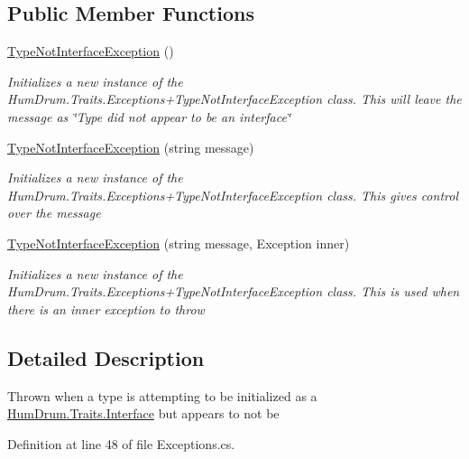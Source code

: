 \subsection*{Public Member Functions}
\begin{DoxyCompactItemize}
\item 
\hyperlink{classHumDrum_1_1Traits_1_1Exceptions_1_1TypeNotInterfaceException_a29b2ddfce71c620a9c62087149af2f23}{Type\+Not\+Interface\+Exception} ()
\begin{DoxyCompactList}\small\item\em Initializes a new instance of the Hum\+Drum.\+Traits.\+Exceptions+\+Type\+Not\+Interface\+Exception class. This will leave the message as \char`\"{}\+Type did not appear to be an interface\char`\"{} \end{DoxyCompactList}\item 
\hyperlink{classHumDrum_1_1Traits_1_1Exceptions_1_1TypeNotInterfaceException_afb1f9e4016996d15d225cb0b3fe826c3}{Type\+Not\+Interface\+Exception} (string message)
\begin{DoxyCompactList}\small\item\em Initializes a new instance of the Hum\+Drum.\+Traits.\+Exceptions+\+Type\+Not\+Interface\+Exception class. This gives control over the message \end{DoxyCompactList}\item 
\hyperlink{classHumDrum_1_1Traits_1_1Exceptions_1_1TypeNotInterfaceException_a0af1718df1e02150029bad6dbaec3ade}{Type\+Not\+Interface\+Exception} (string message, Exception inner)
\begin{DoxyCompactList}\small\item\em Initializes a new instance of the Hum\+Drum.\+Traits.\+Exceptions+\+Type\+Not\+Interface\+Exception class. This is used when there is an inner exception to throw \end{DoxyCompactList}\end{DoxyCompactItemize}


\subsection{Detailed Description}
Thrown when a type is attempting to be initialized as a \hyperlink{classHumDrum_1_1Traits_1_1Interface}{Hum\+Drum.\+Traits.\+Interface} but appears to not be 



Definition at line 48 of file Exceptions.\+cs.



